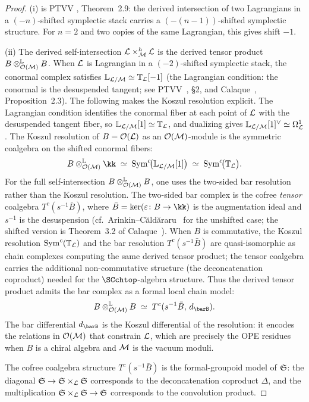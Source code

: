 \begin{proof}
(i) is PTVV \cite{PTVV13}, Theorem~2.9: the derived intersection
of two Lagrangians in a $(-n)$-shifted symplectic stack carries a
$(-(n-1))$-shifted symplectic structure. For $n = 2$ and two
copies of the same Lagrangian, this gives shift $-1$.

(ii) The derived self-intersection
$\mathcal L \times_\mathcal M^h \mathcal L$ is the derived tensor product
$B \otimes^{\mathbb{L}}_{\mathcal O(\mathcal M)} B$. When $\mathcal L$ is Lagrangian
in a $(-2)$-shifted symplectic stack,
the conormal complex satisfies
$\mathbb{L}_{\mathcal L/\mathcal M} \simeq \mathbb{T}_\mathcal L[-1]$
(the Lagrangian condition: the conormal is the desuspended tangent;
see PTVV~\cite{PTVV13}, \S2, and
Calaque~\cite{Cal15}, Proposition~2.3).
The following makes the Koszul resolution explicit.
The Lagrangian condition identifies the conormal fiber at each
point of $\mathcal L$ with the desuspended tangent fiber, so
$\mathbb{L}_{\mathcal L/\mathcal M}[1] \simeq \mathbb{T}_\mathcal L$, and dualizing
gives $\mathbb{L}_{\mathcal L/\mathcal M}[1]^\vee \simeq \Omega^1_\mathcal L$. The
Koszul resolution of $B = \mathcal O(\mathcal L)$ as an $\mathcal O(\mathcal M)$-module is the
symmetric coalgebra on the shifted conormal fibers:
\[
B \otimes^{\mathbb{L}}_{\cO(\cM)} \kk
\;\simeq\;
\Sym^c\!\bigl(\mathbb{L}_{\cL/\cM}[1]\bigr)
\;\simeq\;
\Sym^c\!\bigl(\mathbb{T}_\cL\bigr).
\]
For the full self-intersection $B \otimes^{\mathbb{L}}_{\mathcal O(\mathcal M)} B$,
one uses the two-sided bar resolution rather than the Koszul
resolution. The two-sided bar complex is the cofree
\emph{tensor} coalgebra $T^c(s^{-1}\bar B)$, where
$\bar B = \ker(\varepsilon\colon B \to \kk)$ is the augmentation
ideal and $s^{-1}$ is the desuspension
(cf.\ Arinkin--C\u{a}ld\u{a}raru~\cite{AC12} for the unshifted
case; the shifted version is Theorem~3.2 of
Calaque~\cite{Cal15}).
When $B$ is commutative,
the Koszul resolution $\operatorname{Sym}^c(\mathbb{T}_\mathcal L)$ and the bar
resolution $T^c(s^{-1}\bar B)$ are quasi-isomorphic as chain
complexes computing the same derived tensor product; the tensor
coalgebra carries the additional non-commutative structure
(the deconcatenation coproduct) needed for the $\SCchtop$-algebra
structure. Thus the derived tensor product admits the bar complex
as a formal local chain model:
\[
B \otimes^{\mathbb{L}}_{\cO(\cM)} B
\;\simeq\;
T^c(s^{-1}\bar B, \, d_{\barB}).
\]
The bar differential $d_{\barB}$ is the Koszul differential of
the resolution: it encodes the relations in $\mathcal O(\mathcal M)$ that
constrain $\mathcal L$, which are precisely the OPE residues when
$B$ is a chiral algebra and $\mathcal M$ is the vacuum moduli.

The cofree coalgebra structure $T^c(s^{-1}\bar B)$ is the
formal-groupoid model of $\mathfrak{S}$: the
diagonal $\mathfrak{S} \to \mathfrak{S} \times_\mathcal L \mathfrak{S}$ corresponds
to the deconcatenation coproduct $\Delta$, and the multiplication
$\mathfrak{S} \times_\mathcal L \mathfrak{S} \to \mathfrak{S}$ corresponds to the
convolution product.


\end{proof}
